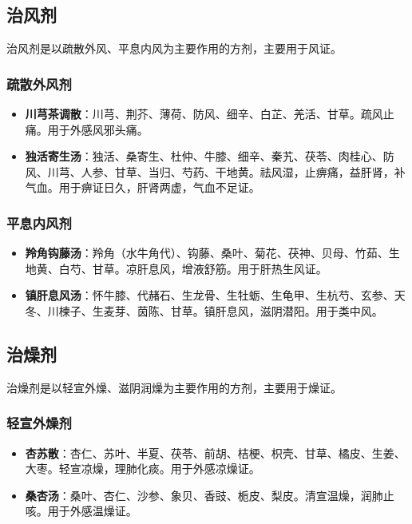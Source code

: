 \documentclass[12pt,UTF8]{ctexbook}
\begin{document}
\subsection{治风剂}

治风剂是以疏散外风、平息内风为主要作用的方剂，主要用于风证。

\subsubsection{疏散外风剂}

\begin{itemize}
\item \textbf{川芎茶调散}：川芎、荆芥、薄荷、防风、细辛、白芷、羌活、甘草。疏风止痛。用于外感风邪头痛。
\item \textbf{独活寄生汤}：独活、桑寄生、杜仲、牛膝、细辛、秦艽、茯苓、肉桂心、防风、川芎、人参、甘草、当归、芍药、干地黄。祛风湿，止痹痛，益肝肾，补气血。用于痹证日久，肝肾两虚，气血不足证。
\end{itemize}

\subsubsection{平息内风剂}

\begin{itemize}
\item \textbf{羚角钩藤汤}：羚角（水牛角代）、钩藤、桑叶、菊花、茯神、贝母、竹茹、生地黄、白芍、甘草。凉肝息风，增液舒筋。用于肝热生风证。
\item \textbf{镇肝息风汤}：怀牛膝、代赭石、生龙骨、生牡蛎、生龟甲、生杭芍、玄参、天冬、川楝子、生麦芽、茵陈、甘草。镇肝息风，滋阴潜阳。用于类中风。
\end{itemize}

\subsection{治燥剂}

治燥剂是以轻宣外燥、滋阴润燥为主要作用的方剂，主要用于燥证。

\subsubsection{轻宣外燥剂}

\begin{itemize}
\item \textbf{杏苏散}：杏仁、苏叶、半夏、茯苓、前胡、桔梗、枳壳、甘草、橘皮、生姜、大枣。轻宣凉燥，理肺化痰。用于外感凉燥证。
\item \textbf{桑杏汤}：桑叶、杏仁、沙参、象贝、香豉、栀皮、梨皮。清宣温燥，润肺止咳。用于外感温燥证。
\end{itemize}
\end{document}
